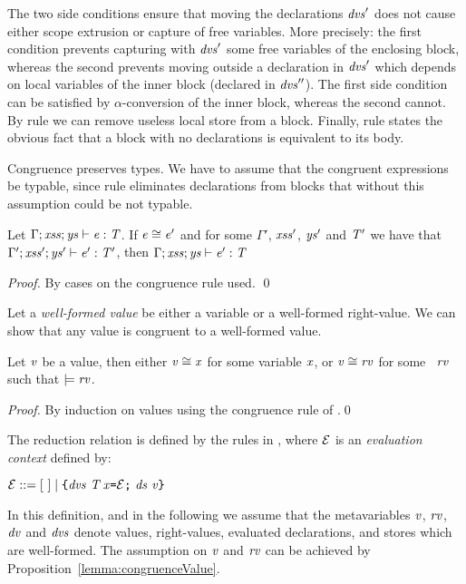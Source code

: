 The two side conditions ensure that moving the declarations {$\mathit{dvs}'$} does not cause either scope extrusion 
or capture of free variables. More precisely: the first condition prevents capturing with $\mathit{dvs}'$ some free 
variables of the enclosing block, whereas the second prevents moving outside a declaration in $\mathit{dvs}'$ which 
depends on local variables of the inner block (declared in $\mathit{dvs}''$). The first side condition can be 
satisfied by $\alpha$-conversion of the inner block, whereas the second cannot. 
By rule  we can remove useless local store from a block.
Finally, rule  states the obvious fact that a block with no declarations is equivalent 
to its body.

{Congruence preserves types. We have to assume that the congruent expressions be typable, since rule
 eliminates declarations from blocks that without this assumption could be not typable.
\begin{proposition}\label{lemma:congruenceTypes}
Let $\Gamma;\mathit{xss};\mathit{ys}\vdash \mathit{e}:{\mathit{T}}$. If $\mathit{e}\cong\mathit{e}'$ and for some $\Gamma'$, $\mathit{xss}'$, $\mathit{ys}'$ and $\mathit{T}'$ we have  that $\Gamma';\mathit{xss}';\mathit{ys}'\vdash \mathit{e}':{\mathit{T}'}$, then $\Gamma;\mathit{xss};\mathit{ys}\vdash \mathit{e}':{\mathit{T}}$
\end{proposition}
\begin{proof}
By cases on the congruence rule used. \qed
\end{proof}}

Let a {\em  well-formed value} be either a variable or a well-formed right-value.
We can show that any value is congruent to a well-formed value.
\begin{proposition}\label{lemma:congruenceValue}
Let $\mathit{v}$ be a value, then either ${\mathit{v}}\cong{\mathit{x}}$ for some variable $\mathit{x}$, or ${\mathit{v}}\cong{\mathit{rv}}$ for some 
\storableVal\  $\mathit{rv}$ {such that $\models\mathit{rv}$}. 
\end{proposition}
\begin{proof}
By induction on values using the congruence rule of .\qed
\end{proof}

The reduction relation is defined by the rules in , where ${\cal{E}}$ is an {\em evaluation context} 
defined by:
\begin{center}
$\ctx ::=\emptyctx\mid\Block{\dvs\ \Dec{\T}{\x}{\ctx}\ \decs}{\val}
$
\end{center}
{In this definition, and in the following we assume that the metavariables $\mathit{v}$, $\mathit{rv}$, $\mathit{dv}$ and $\mathit{dvs}$ denote values,  right-values, evaluated declarations, and stores which are well-formed. The assumption on $\mathit{v}$ and $\mathit{rv}$ can be achieved by Proposition~\ref{lemma:congruenceValue}.}

